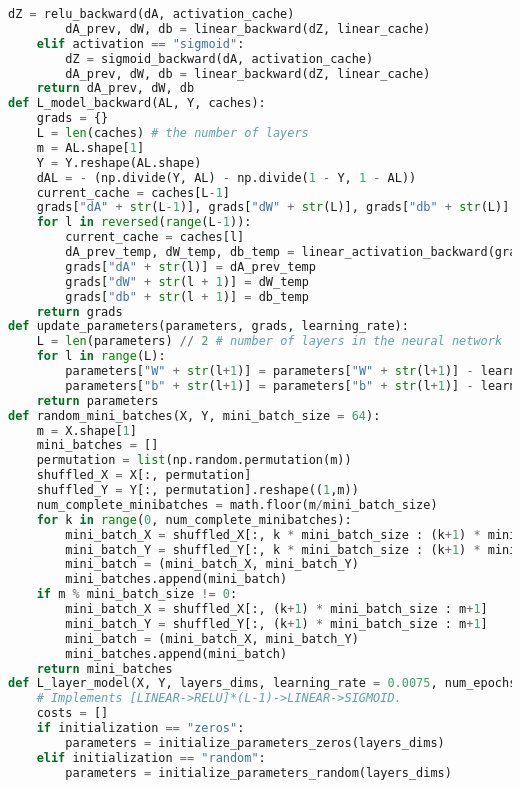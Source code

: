 \begin{lstlisting}[language=Python]
        dZ = relu_backward(dA, activation_cache)
        dA_prev, dW, db = linear_backward(dZ, linear_cache)
    elif activation == "sigmoid":
        dZ = sigmoid_backward(dA, activation_cache)
        dA_prev, dW, db = linear_backward(dZ, linear_cache)
    return dA_prev, dW, db
def L_model_backward(AL, Y, caches):
    grads = {}
    L = len(caches) # the number of layers
    m = AL.shape[1]
    Y = Y.reshape(AL.shape) 
    dAL = - (np.divide(Y, AL) - np.divide(1 - Y, 1 - AL)) 
    current_cache = caches[L-1]
    grads["dA" + str(L-1)], grads["dW" + str(L)], grads["db" + str(L)] = linear_activation_backward(dAL, current_cache, "sigmoid")
    for l in reversed(range(L-1)):
        current_cache = caches[l]
        dA_prev_temp, dW_temp, db_temp = linear_activation_backward(grads["dA" + str(l + 1)], current_cache, "relu")
        grads["dA" + str(l)] = dA_prev_temp
        grads["dW" + str(l + 1)] = dW_temp
        grads["db" + str(l + 1)] = db_temp
    return grads
def update_parameters(parameters, grads, learning_rate):
    L = len(parameters) // 2 # number of layers in the neural network
    for l in range(L):
        parameters["W" + str(l+1)] = parameters["W" + str(l+1)] - learning_rate * grads["dW" + str(l+1)]
        parameters["b" + str(l+1)] = parameters["b" + str(l+1)] - learning_rate * grads["db" + str(l+1)]
    return parameters
def random_mini_batches(X, Y, mini_batch_size = 64):
    m = X.shape[1]   
    mini_batches = []
    permutation = list(np.random.permutation(m))
    shuffled_X = X[:, permutation]
    shuffled_Y = Y[:, permutation].reshape((1,m))
    num_complete_minibatches = math.floor(m/mini_batch_size) 
    for k in range(0, num_complete_minibatches):
        mini_batch_X = shuffled_X[:, k * mini_batch_size : (k+1) * mini_batch_size]
        mini_batch_Y = shuffled_Y[:, k * mini_batch_size : (k+1) * mini_batch_size]
        mini_batch = (mini_batch_X, mini_batch_Y)
        mini_batches.append(mini_batch)
    if m % mini_batch_size != 0:
        mini_batch_X = shuffled_X[:, (k+1) * mini_batch_size : m+1]
        mini_batch_Y = shuffled_Y[:, (k+1) * mini_batch_size : m+1]
        mini_batch = (mini_batch_X, mini_batch_Y)
        mini_batches.append(mini_batch)
    return mini_batches
def L_layer_model(X, Y, layers_dims, learning_rate = 0.0075, num_epochs = 10000, mini_batch_size = 64, initialization = "he", print_cost = False):
    # Implements [LINEAR->RELU]*(L-1)->LINEAR->SIGMOID.
    costs = [] 
    if initialization == "zeros":
        parameters = initialize_parameters_zeros(layers_dims)
    elif initialization == "random":
        parameters = initialize_parameters_random(layers_dims)

\end{lstlisting}
